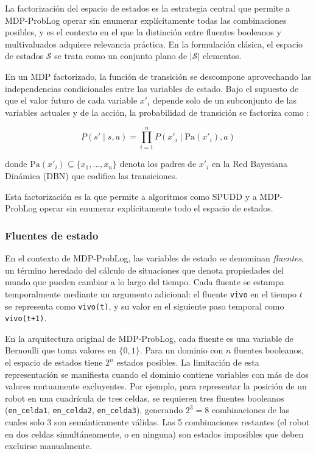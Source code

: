 La factorización del espacio de estados es la estrategia central que permite a MDP-ProbLog operar sin enumerar explícitamente todas las combinaciones posibles, y es el contexto en el que la distinción entre fluentes booleanos y multivaluados adquiere relevancia práctica. En la formulación clásica, el espacio de estados $\mathcal{S}$ se trata como un conjunto plano de $|\mathcal{S}|$ elementos.

En un MDP factorizado, la función de transición se descompone aprovechando las independencias condicionales entre las variables de estado. Bajo el supuesto de que el valor futuro de cada variable $x'_i$ depende solo de un subconjunto de las variables actuales y de la acción, la probabilidad de transición se factoriza como \cite{boutilier2000stochastic}:

\begin{equation}
    P(s' \mid s, a) = \prod_{i=1}^{n} P(x'_i \mid \text{Pa}(x'_i), a)
    \label{eq:factored-transition}
\end{equation}

donde $\text{Pa}(x'_i) \subseteq \{x_1, \ldots, x_n\}$ denota los padres de $x'_i$ en la Red Bayesiana Dinámica (DBN) que codifica las transiciones.

Esta factorización es la que permite a algoritmos como SPUDD \cite{hoey1999spudd} y a MDP-ProbLog \cite{bueno2016mdp} operar sin enumerar explícitamente todo el espacio de estados.

\subsubsection{Fluentes de estado}

En el contexto de MDP-ProbLog, las variables de estado se denominan \textit{fluentes}, un término heredado del cálculo de situaciones que denota propiedades del mundo que pueden cambiar a lo largo del tiempo. Cada fluente se estampa temporalmente mediante un argumento adicional: el fluente \texttt{vivo} en el tiempo $t$ se representa como \texttt{vivo(t)}, y su valor en el siguiente paso temporal como \texttt{vivo(t+1)}.

En la arquitectura original de MDP-ProbLog, cada fluente es una variable de Bernoulli que toma valores en $\{0, 1\}$. Para un dominio con $n$ fluentes booleanos, el espacio de estados tiene $2^n$ estados posibles. La limitación de esta representación se manifiesta cuando el dominio contiene variables con más de dos valores mutuamente excluyentes. Por ejemplo, para representar la posición de un robot en una cuadrícula de tres celdas, se requieren tres fluentes booleanos (\texttt{en\_celda1}, \texttt{en\_celda2}, \texttt{en\_celda3}), generando $2^3 = 8$ combinaciones de las cuales solo 3 son semánticamente válidas. Las 5 combinaciones restantes (el robot en dos celdas simultáneamente, o en ninguna) son estados imposibles que deben excluirse manualmente.

